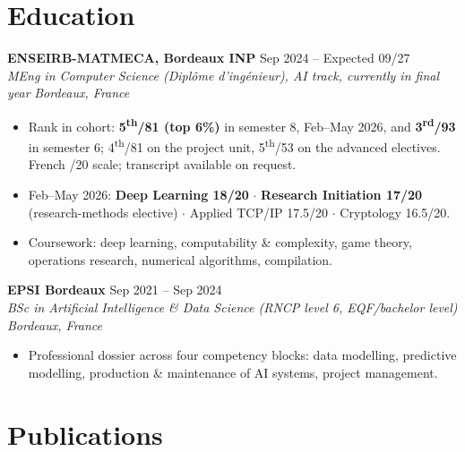 \documentclass[10pt, letterpaper]{article}
\newcommand{\entry}[4]{%
  \noindent \textbf{#1} \hfill #2 \\
  \textit{#3} \hfill \textit{#4} \par
}
\begin{document}
\section{Education}

\entry{ENSEIRB-MATMECA, Bordeaux INP}{Sep 2024 -- Expected 09/27}%
{MEng in Computer Science (\textit{Diplôme d'ingénieur}), AI track, currently in final year}{Bordeaux, France}
\begin{itemize}
    \item Rank in cohort: \textbf{5\textsuperscript{th}/81 (top 6\%)} in semester 8, Feb--May 2026, and \textbf{3\textsuperscript{rd}/93} in semester 6; 4\textsuperscript{th}/81 on the project unit, 5\textsuperscript{th}/53 on the advanced electives. French /20 scale; transcript available on request.
    \item Feb--May 2026: \textbf{Deep Learning 18/20} $\cdot$ \textbf{Research Initiation 17/20} (research-methods elective) $\cdot$ Applied TCP/IP 17.5/20 $\cdot$ Cryptology 16.5/20.
    \item Coursework: deep learning, computability \& complexity, game theory, operations research, numerical algorithms, compilation.
\end{itemize}

\vspace{4pt}

\entry{EPSI Bordeaux}{Sep 2021 -- Sep 2024}%
{BSc in Artificial Intelligence \& Data Science (RNCP level 6, EQF/bachelor level)}{Bordeaux, France}
\begin{itemize}
    \item Professional dossier across four competency blocks: data modelling, predictive modelling, production \& maintenance of AI systems, project management.
\end{itemize}

\section{Publications}
\end{document}
